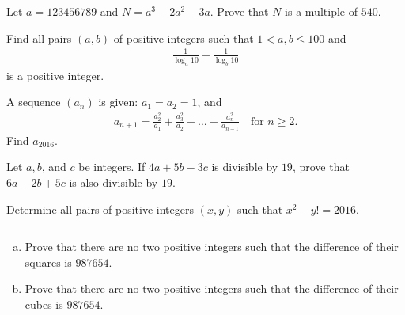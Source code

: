 \documentclass[problems.tex]{subfile}
\begin{document}
	
	
	\begin{problem}
		Let $a = 123456789$ and $N = a^3 - 2a^2 - 3a$. Prove that $N$ is a multiple of $540$.
	\end{problem}
	
	
	
	\begin{problem}
		Find all pairs $(a, b)$ of positive integers such that $1 < a, b \leq 100$ and
		\begin{align*}
			\frac{1}{\log_a 10} + \frac{1}{\log_b 10} 
		\end{align*}
		is a positive integer.
	\end{problem}
	
	
	
	\begin{problem}
		A sequence $(a_n)$ is given: $a_1=a_2=1$, and
		\begin{align*}
			a_{n+1} = \frac{a_2^2}{a_1} + \frac{a_3^2}{a_2} + \dots + \frac{a_n^2}{a_{n-1}} \quad \text{for } n \geq 2.
		\end{align*}
		Find $a_{2016}$.
	\end{problem}
	
	
	
	\begin{problem}
		Let $a, b$, and $c$ be integers. If $4a+5b-3c$ is divisible by $19$, prove that $6a-2b+5c$ is also divisible by $19$.
	\end{problem}
	
	
	
	\begin{problem}
		Determine all pairs of positive integers $(x, y)$ such that $x^2 - y! = 2016$.
	\end{problem}
	
	
	
	\begin{problem}
		$ $
		\begin{enumerate}[(a)]
			\item Prove that there are no two positive integers such that the difference of their squares is $987654$.
			\item Prove that there are no two positive integers such that the difference of their cubes is $987654$.
		\end{enumerate}
	\end{problem}
	
\end{document}
